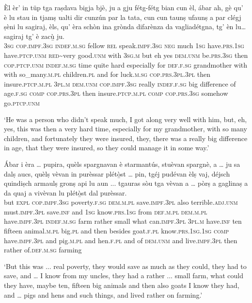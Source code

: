 \begin{linenumbers}
\gll  Èl èr’ in tüp tga raṣdava bigja bjè, ju a gju fétg-fétg bian cun èl, ábar ah, gè qu’ è lu stau in tjamṣ ualti dir cunzún par la tata, cun cun taunṣ ufaunṣ a par clégj ṣèni lu sagiraj, èls, qu’ èra schòn ina grònda difarènza da vagliadétgna, tg' èn lu… sagiraj tg' è zacù̱ ju. \\
  \textsc{3sg} \textsc{cop.impf.3sg} \textsc{indef.m.sg} fellow \textsc{rel} speak.\textsc{impf.3sg} \textsc{neg} much \textsc{1sg} have.\textsc{prs.1sg} have.\textsc{ptcp.unm} \textsc{red}\textasciitilde{very} good.\textsc{unm} with \textsc{3sg.m} but eh yes \textsc{dem.unm} be.\textsc{prs.3sg} then \textsc{cop.ptcp.unm} \textsc{indef.m.sg} time quite hard especially for \textsc{def.f.sg} grandmother with with so\_many.\textsc{m.pl} children.\textsc{pl} and for luck.\textsc{m.sg} \textsc{cop.prs.3pl.3pl}  then insure.\textsc{ptcp.m.pl} \textsc{3pl.m} \textsc{dem.unm} \textsc{cop.impf.3sg} really \textsc{indef.f.sg} big difference of age.\textsc{f.sg} \textsc{comp} \textsc{cop.prs.3pl} then insure.\textsc{ptcp.m.pl} \textsc{comp} \textsc{cop.prs.3sg} somehow go.\textsc{ptcp.unm}\\
\end{linenumbers}
\medskip
\glt `He was a person who didn’t speak much, I got along very well with him, but, eh, yes, this was then a very hard time, especially for my grandmother, with so many children, and fortunately they were insured, they, there was a really big difference in age, that they were insured, so they could manage it in some way.'
\medskip

\begin{linenumbers}
\gll   Ábar i èra … pupira, quèls spargnavan è starmantús, stuèvan spargnè, a … ju sa dalṣ aucs, quèlṣ vèvan in purèssar plétò̱st … pin, tgéj pudévan èlṣ vaj, déjsch quindiṣch armaulṣ gronṣ api lu aun ... tgauras sòu tga vèvan a … pòrṣ a gaglinaṣ a da quaj a vivèvan lu plétò̱st dal purèssar. \\
 but \textsc{expl} \textsc{cop.impf.3sg} {} poverty.\textsc{f.sg} \textsc{dem.m.pl} save.\textsc{impf.3pl} also terrible.\textsc{adj.unm} must.\textsc{impf.3pl} save.\textsc{inf} and  {} \textsc{1sg} know.\textsc{prs.1sg} from \textsc{def.m.pl} \textsc{dem.m.pl} have.\textsc{impf.3pl} \textsc{indef.m.sg} farm rather {} small what can.\textsc{impf.3pl} \textsc{3pl.m} have.\textsc{inf} ten fifteen animal.\textsc{m.pl} big.\textsc{pl} and then besides {} goat.\textsc{f.pl} know.\textsc{prs.1sg.1sg} \textsc{comp} have.\textsc{impf.3pl} and {} pig.\textsc{m.pl} and hen.\textsc{f.pl} and of \textsc{dem.unm} and live.\textsc{impf.3pl} then rather of.\textsc{def.m.sg} farming\\
\end{linenumbers}
\medskip
\glt `But this was ... real poverty, they would save as much as they  could, they had to save, and … I know from my uncles, they had a rather ... small farm, what could they have, maybe ten, fifteen big animals and then also goats I know they had, and … pigs and hens and such things, and lived rather on farming.'
\medskip

